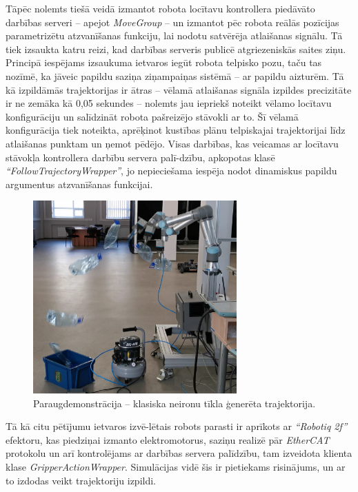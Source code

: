 \documentclass[12pt, a4paper]{article}
\numberwithin{equation}{section} %
\begin{document}
Tāpēc nolemts tiešā veidā izmantot robota locītavu kontrollera piedāvāto darbības serveri -- apejot \textit{MoveGroup} -- un izmantot pēc robota reālās pozīcijas parametrizētu atzvanīšanas funkciju, lai nodotu satvērēja atlaišanas signālu. Tā tiek izsaukta katru reizi, kad darbības serveris publicē atgriezeniskās saites ziņu. Principā iespējams izsaukuma ietvaros iegūt robota telpisko pozu, taču tas nozīmē, ka jāveic papildu saziņa ziņampaiņas sistēmā -- ar papildu aizturēm. Tā kā izpildāmās trajektorijas ir ātras -- vēlamā atlaišanas signāla izpildes precizitāte ir ne zemāka kā 0,05 sekundes -- nolemts jau iepriekš noteikt vēlamo locītavu konfigurāciju un salīdzināt robota pašreizējo stāvokli ar to. Šī vēlamā konfigurācija tiek noteikta, aprēķinot kustības plānu telpiskajai trajektorijai līdz atlaišanas punktam un ņemot pēdējo. Visas darbības, kas veicamas ar locītavu stāvokļa kontrollera darbību servera palī-dzību, apkopotas klasē \textit{``FollowTrajectoryWrapper''}, jo nepieciešama iespēja nodot dinamiskus papildu argumentus atzvanīšanas funkcijai. 

\begin{figure}[t!]
    \centering
    \includegraphics[height=7.4cm,page=1]{../img/action_sequence.png}
    \caption{Paraugdemonstrācija -- klasiska neironu tīkla ģenerēta trajektorija.}
\end{figure}


Tā kā citu pētījumu ietvaros izvē-lētais robots parasti ir aprīkots ar \textit{``Robotiq 2f''} efektoru, kas piedziņai izmanto elektromotorus, saziņu realizē pār \textit{EtherCAT} protokolu un arī kontrolējams ar darbības servera palīdzību, tam izveidota klienta klase \textit{GripperActionWrapper}. Simulācijas vidē šis ir pietiekams risinājums, un ar to izdodas veikt trajektoriju izpildi.
\end{document}

